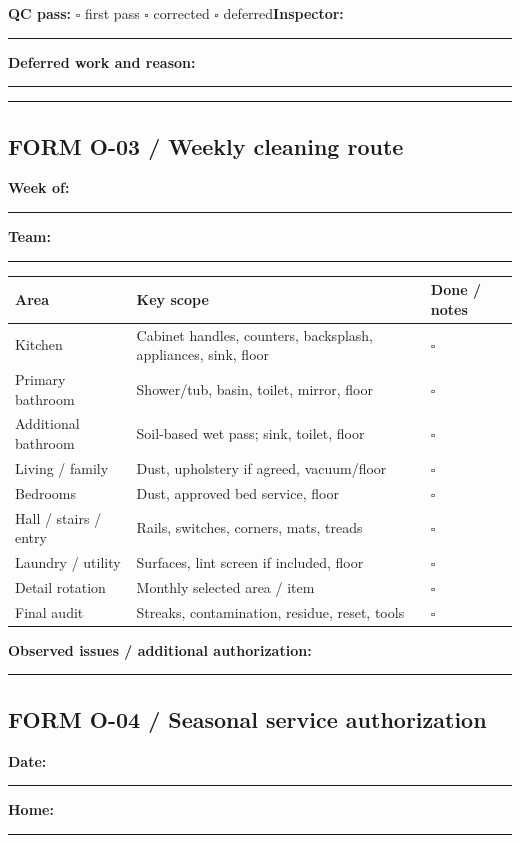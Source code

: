 \documentclass[10pt,letterpaper,oneside]{article}
\begin{document}
\textbf{QC pass:} \(\square\) first pass \(\square\) corrected \(\square\) deferred\quad \textbf{Inspector:} \rule{1.7in}{.3pt}\par\vspace{11pt}\textbf{Deferred work and reason:}\par\rule{\linewidth}{.3pt}\par\vspace{9pt}\rule{\linewidth}{.3pt}
\newpage\subsection*{FORM O-03 / Weekly cleaning route}
\textbf{Week of:} \rule{1.8in}{.3pt}\qquad \textbf{Team:} \rule{2.4in}{.3pt}\par\medskip
\begin{tabularx}{\linewidth}{p{.26\linewidth}X p{.21\linewidth}}\toprule Area & Key scope & Done / notes\\\midrule
Kitchen & Cabinet handles, counters, backsplash, appliances, sink, floor & \(\square\) \\
Primary bathroom & Shower/tub, basin, toilet, mirror, floor & \(\square\) \\
Additional bathroom & Soil-based wet pass; sink, toilet, floor & \(\square\) \\
Living / family & Dust, upholstery if agreed, vacuum/floor & \(\square\) \\
Bedrooms & Dust, approved bed service, floor & \(\square\) \\
Hall / stairs / entry & Rails, switches, corners, mats, treads & \(\square\) \\
Laundry / utility & Surfaces, lint screen if included, floor & \(\square\) \\
Detail rotation & Monthly selected area / item & \(\square\) \\
Final audit & Streaks, contamination, residue, reset, tools & \(\square\) \\
\bottomrule\end{tabularx}
\vspace{14pt}\textbf{Observed issues / additional authorization:}\par\vspace{14pt}\rule{\linewidth}{.3pt}
\newpage\subsection*{FORM O-04 / Seasonal service authorization}
\textbf{Date:} \rule{2in}{.3pt}\quad\textbf{Home:} \rule{2.5in}{.3pt}
\end{document}
